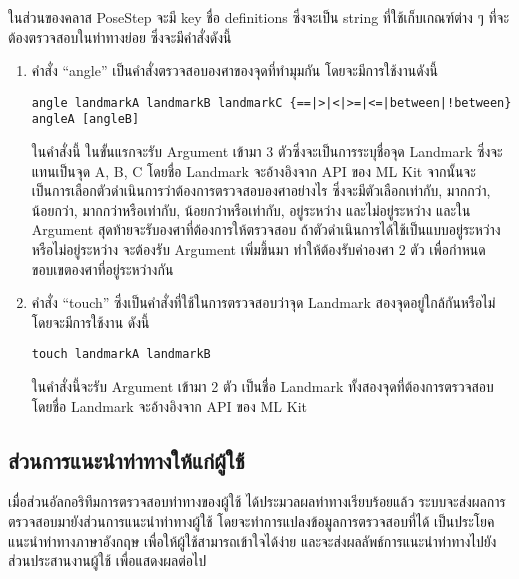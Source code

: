 ในส่วนของคลาส PoseStep จะมี key ชื่อ definitions ซึ่งจะเป็น string ที่ใช้เก็บเกณฑ์ต่าง ๆ ที่จะต้องตรวจสอบในท่าทางย่อย ซึ่งจะมีคำสั่งดังนี้

\begin{enumerate}
    \item คำสั่ง “angle” เป็นคำสั่งตรวจสอบองศาของจุดที่ทำมุมกัน โดยจะมีการใช้งานดังนี้
    \begin{lstlisting}[caption=คำสั่ง angle]
        angle landmarkA landmarkB landmarkC {==|>|<|>=|<=|between|!between} angleA [angleB]
    \end{lstlisting}
    \indent ในคำสั่งนี้ ในขั้นแรกจะรับ Argument เข้ามา 3 ตัวซึ่งจะเป็นการระบุชื่อจุด Landmark ซึ่งจะแทนเป็นจุด A, B, C โดยชื่อ Landmark จะอ้างอิงจาก API ของ ML Kit จากนั้นจะเป็นการเลือกตัวดำเนินการว่าต้องการตรวจสอบองศาอย่างไร ซึ่งจะมีตัวเลือกเท่ากับ, มากกว่า, น้อยกว่า, มากกว่าหรือเท่ากับ, น้อยกว่าหรือเท่ากับ, อยู่ระหว่าง และไม่อยู่ระหว่าง และใน Argument สุดท้ายจะรับองศาที่ต้องการให้ตรวจสอบ ถ้าตัวดำเนินการได้ใช้เป็นแบบอยู่ระหว่างหรือไม่อยู่ระหว่าง จะต้องรับ Argument เพิ่มขึ้นมา ทำให้ต้องรับค่าองศา 2 ตัว เพื่อกำหนดขอบเขตองศาที่อยู่ระหว่างกัน
    \item คำสั่ง “touch” ซึ่งเป็นคำสั่งที่ใช้ในการตรวจสอบว่าจุด Landmark สองจุดอยู่ใกล้กันหรือไม่ โดยจะมีการใช้งาน ดังนี้
    \begin{lstlisting}[caption=คำสั่ง touch]
        touch landmarkA landmarkB
    \end{lstlisting}
    ในคำสั่งนี้จะรับ Argument เข้ามา 2 ตัว เป็นชื่อ Landmark ทั้งสองจุดที่ต้องการตรวจสอบ โดยชื่อ Landmark จะอ้างอิงจาก API ของ ML Kit
\end{enumerate}

\subsection{ส่วนการแนะนำท่าทางให้แก่ผู้ใช้}
เมื่อส่วนอัลกอริทึมการตรวจสอบท่าทางของผู้ใช้ ได้ประมวลผลท่าทางเรียบร้อยแล้ว ระบบจะส่งผลการตรวจสอบมายังส่วนการแนะนำท่าทางผู้ใช้ โดยจะทำการแปลงข้อมูลการตรวจสอบที่ได้ เป็นประโยคแนะนำท่าทางภาษาอังกฤษ เพื่อให้ผู้ใช้สามารถเข้าใจได้ง่าย และจะส่งผลลัพธ์การแนะนำท่าทางไปยังส่วนประสานงานผู้ใช้ เพื่อแสดงผลต่อไป